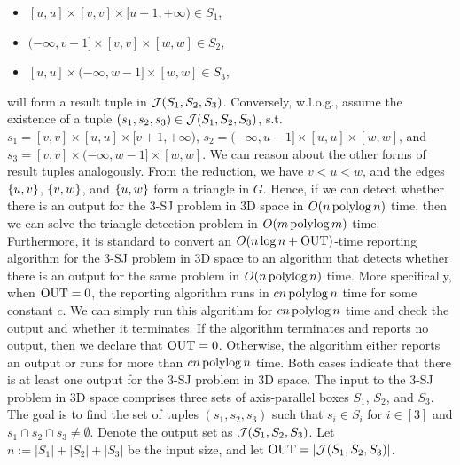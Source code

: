 \begin{itemize}
    \item $[u,u]\times [v,v]\times[u+1, +\infty)\in S_1$,
    \item $(-\infty,v-1]\times[v,v]\times [w,w] \in S_2$,
    \item $[u,u]\times(-\infty, w-1]\times [w,w] \in S_3$,
\end{itemize}
will form a result tuple in $\mathcal{J}(S_1,S_2,S_3)$. Conversely, w.l.o.g., assume the existence of a tuple $(s_1,s_2,s_3)\in \mathcal{J}(S_1,S_2,S_3)$, s.t. $s_1 = [v,v]\times [u,u]\times[v+1, +\infty)$, $s_2 = (-\infty,u-1]\times[u,u]\times [w,w]$, and $s_3 = [v,v]\times(-\infty, w-1]\times [w,w]$. We can reason about the other forms of result tuples analogously. From the reduction, we have $v< u< w$, and the edges $\{u,v\}$, $\{v,w\}$, and $\{u,w\}$ form a triangle in $G$. 
Hence, if we can detect whether there is an output for the 3-SJ problem in 3D space in $O(n\operatorname*{polylog} n)$ time, then we can solve the triangle detection problem 
in $O(m \operatorname*{polylog} m)$ time. Furthermore, it is standard to convert an $O(n \log n + \mathrm{OUT})$-time reporting algorithm for the 3-SJ problem in 3D space to an algorithm that detects whether there is an output for the same problem in $O(n \operatorname*{polylog} n)$ time. More specifically, when $\mathrm{OUT} = 0$, the reporting algorithm runs in $cn\operatorname*{polylog} n$ time for some constant $c$. We can simply run this algorithm for $cn\operatorname*{polylog} n$ time and check the output and whether it terminates. If the algorithm terminates and reports no output, then we declare that $\mathrm{OUT} = 0$. Otherwise, the algorithm either reports an output or runs for more than $cn\operatorname*{polylog} n$ time. Both cases indicate that there is at least one output for the 3-SJ problem in 3D space.  The input to the 3-SJ problem in 3D space comprises
 three sets of axis-parallel boxes $S_1$, $S_2$, and $S_3$. 
The goal is to find the set of tuples $(s_1,s_2,s_3)$ such that $s_i \in S_i$ for $i \in [3]$ and $s_1 \cap s_2 \cap s_3 \neq \emptyset$. Denote the output set as $\mathcal{J}(S_1,S_2,S_3)$.
Let $n:=|S_1|+|S_2|+|S_3|$ be the input size, and let $\mathrm{OUT} = |\mathcal{J}(S_1,S_2,S_3)|$.

